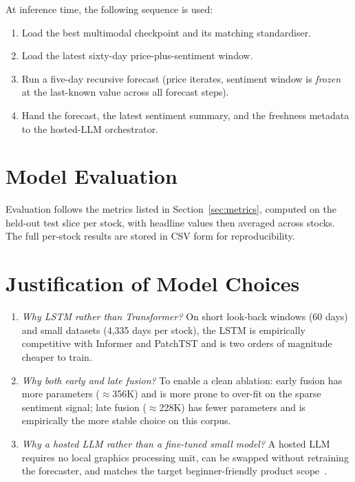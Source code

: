 \documentclass[12pt,a4paper,oneside]{report}
\begin{document}
At inference time, the following sequence is used:

\begin{enumerate}[leftmargin=*,itemsep=2pt]
  \item Load the best multimodal checkpoint and its matching
        standardiser.
  \item Load the latest sixty-day price-plus-sentiment window.
  \item Run a five-day recursive forecast (price iterates,
        sentiment window is \emph{frozen} at the last-known value
        across all forecast steps).
  \item Hand the forecast, the latest sentiment summary, and the
        freshness metadata to the hosted-\ac{LLM} orchestrator.
\end{enumerate}

\section{Model Evaluation}

Evaluation follows the metrics listed in
Section~\ref{sec:metrics}, computed on the held-out test slice
per stock, with headline values then averaged across stocks. The
full per-stock results are stored in CSV form for reproducibility.

\section{Justification of Model Choices}

\begin{enumerate}[leftmargin=*,itemsep=2pt]
  \item \emph{Why \ac{LSTM} rather than Transformer?} On short
        look-back windows (60 days) and small datasets
        (4{,}335 days per stock), the \ac{LSTM} is empirically
        competitive with Informer and PatchTST
        \cite{fischer2018deep,zhou2021informer,nie2023patchtst}
        and is two orders of magnitude cheaper to train.
  \item \emph{Why both early and late fusion?} To enable a clean
        ablation: early fusion has more parameters ($\approx$356K)
        and is more prone to over-fit on the sparse sentiment
        signal; late fusion ($\approx$228K) has fewer parameters
        and is empirically the more stable choice on this corpus.
  \item \emph{Why a hosted \ac{LLM} rather than a fine-tuned
        small model?} A hosted \ac{LLM} requires no local
        graphics processing unit, can be swapped without
        retraining the forecaster, and matches the target
        beginner-friendly product scope~\cite{lopez2023canchatgpt}.
\end{enumerate}
\end{document}
